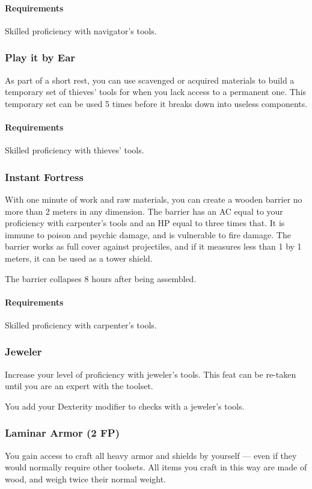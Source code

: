     \paragraph{Requirements} Skilled proficiency with navigator's tools.
\subsubsection{Play it by Ear} \label{feat::playitbyear}
    As part of a short rest, you can use scavenged or acquired materials to build a temporary set of thieves' tools for when you lack access to a permanent one.
    This temporary set can be used 5 times before it breaks down into useless components.
    \paragraph{Requirements} Skilled proficiency with thieves' tools.
\subsubsection{Instant Fortress} \label{feat::instantfortress}
    With one minute of work and raw materials, you can create a wooden barrier no more than 2 meters in any dimension.
    The barrier has an AC equal to your proficiency with carpenter's tools and an HP equal to three times that.
    It is immune to poison and psychic damage, and is vulnerable to fire damage.
    The barrier works as full cover against projectiles, and if it measures less than 1 by 1 meters, it can be used as a tower shield.

    The barrier collapses 8 hours after being assembled.
    \paragraph{Requirements} Skilled proficiency with carpenter's tools.
\subsubsection{Jeweler} \label{feat::jeweler}
    Increase your level of proficiency with jeweler's tools.
    This feat can be re-taken until you are an expert with the toolset.

    You add your Dexterity modifier to checks with a jeweler's tools.
\subsubsection{Laminar Armor (2 FP)} \label{feat::laminararmor}
    You gain access to craft all heavy armor and shields by yourself --- even if they would normally require other toolsets.
    All items you craft in this way are made of wood, and weigh twice their normal weight.

